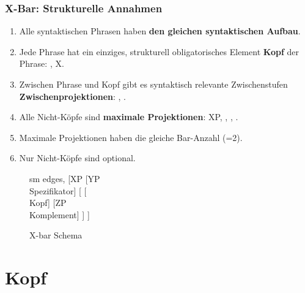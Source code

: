 \begin{frame}
\frametitle{X-Bar: Strukturelle Annahmen}

\begin{multicols}{2}
\begin{enumerate}
	\item Alle syntaktischen Phrasen haben \textbf{den gleichen syntaktischen Aufbau}.
	\item Jede Phrase hat ein einziges, strukturell obligatorisches Element \ras \textbf{Kopf} der Phrase: , X.
	\item Zwischen Phrase und Kopf gibt es syntaktisch relevante Zwischenstufen \ras \textbf{Zwischenprojektionen}: , .
	\item Alle Nicht-Köpfe sind \textbf{maximale Projektionen}: XP, , ,  .
	\item Maximale Projektionen haben die gleiche Bar-Anzahl (=2).
	\item Nur Nicht-Köpfe sind optional.
\end{enumerate}
\end{multicols}

\begin{figure}[b]
	\begin{minipage}[b]{0.05\textwidth}
	\end{minipage} 
	\begin{minipage}[b]{0.50\textwidth}
	\centering
	\tiny{
		\begin{forest}
		sm edges,
		[XP [YP\\Spezifikator]
			[ [\\Kopf]
				[ZP\\Komplement]
			]
		]
		\end{forest}
		}
		\caption{X-bar Schema}	
  	\end{minipage}  
	\begin{minipage}[b]{0.05\textwidth}
  	\end{minipage}
  	
\end{figure}

\end{frame}


\section{Kopf}


